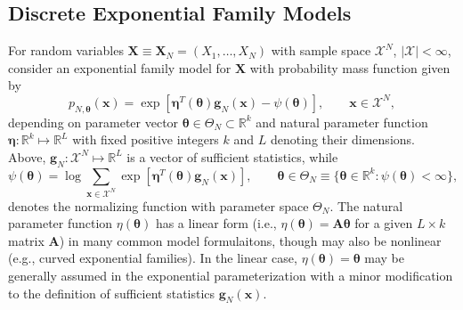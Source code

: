 \documentclass[]{article}
\theoremstyle{definition}
\begin{document}
\subsection{Discrete Exponential Family
Models}\label{discrete-exponential-family-models}

For random variables
\(\boldsymbol X \equiv\boldsymbol X_N= (X_1, \dots, X_N)\) with sample
space \(\mathcal{X}^N\), \(|\mathcal{X}| < \infty\), consider an
exponential family model for \(\boldsymbol X\) with probability mass
function given by
\begin{equation}
\label{eq:expo}
p_{N, \boldsymbol \theta}(\boldsymbol x) = \exp\left[\boldsymbol\eta^T(\boldsymbol \theta) \boldsymbol g_N(\boldsymbol x) - \psi(\boldsymbol \theta)\right], \qquad \boldsymbol x \in \mathcal{X}^N,
\end{equation}
depending on parameter vector
\(\boldsymbol \theta \in \Theta_N \subset \mathbb{R}^{k}\) and natural
parameter function
\(\boldsymbol \eta : \mathbb{R}^k \mapsto \mathbb{R}^L\) with fixed
positive integers \(k\) and \(L\) denoting their dimensions. Above,
\(\boldsymbol g_N : \mathcal{X}^N \mapsto \mathbb{R}^L\) is a vector of
sufficient statistics, while \[
\psi(\boldsymbol \theta) = \log \sum\limits_{\boldsymbol x \in \mathcal{X}^N}\exp\left[\boldsymbol \eta^T(\boldsymbol \theta) \boldsymbol g_N(\boldsymbol x) \right], \qquad \boldsymbol \theta \in \Theta_N\equiv \{\boldsymbol \theta \in \mathbb{R}^k : \psi(\boldsymbol \theta) < \infty \},
\] denotes the normalizing function with parameter space \(\Theta_N\).
The natural parameter function \(\eta (\boldsymbol \theta)\) has a
linear form (i.e.,
\(\eta (\boldsymbol \theta)= \bm{A} \boldsymbol \theta\) for a given
\(L \times k\) matrix \(\bm{A}\)) in many common model formulaitons,
though may also be nonlinear (e.g., curved exponential families). In the
linear case, \(\eta (\boldsymbol \theta) = \boldsymbol \theta\) may be
generally assumed in the exponential parameterization with a minor
modification to the definition of sufficient statistics
\(\boldsymbol g_N(\boldsymbol x)\).
\end{document}
